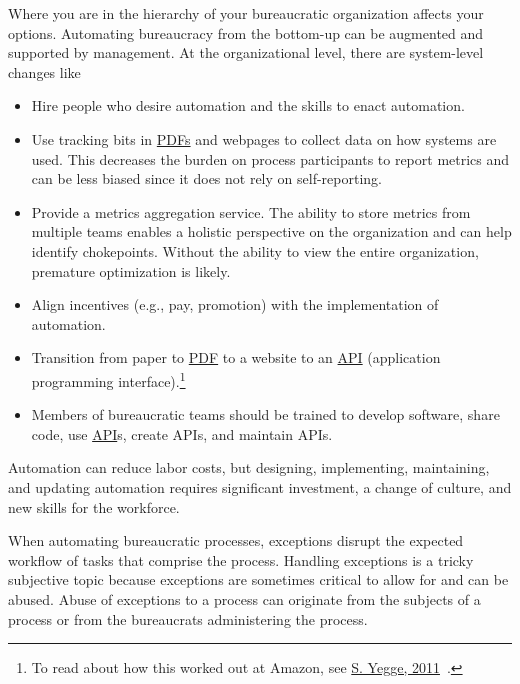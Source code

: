 Where you are in the hierarchy of your bureaucratic organization affects your options. 
Automating bureaucracy from the bottom-up can be augmented and supported by management. 
At the organizational level, there are system-level changes like
\begin{itemize}
    \item Hire people who desire automation and the skills to enact automation.
    \item Use tracking bits in
    \href{https://en.wikipedia.org/wiki/PDF}{PDFs} and webpages to collect data on how systems are used. This decreases the burden on process participants to report metrics and can be less biased since it does not rely on self-reporting.
    \item Provide a metrics aggregation service. The ability to store metrics from multiple teams enables a holistic perspective on the organization and can help identify chokepoints. Without the ability to view the entire organization, premature optimization is likely.
    \item Align incentives (e.g., pay, promotion) with the implementation of automation.
    \item Transition from paper to 
    \href{https://en.wikipedia.org/wiki/PDF}{PDF} 
    to a website to an 
    \href{https://en.wikipedia.org/wiki/API}{API} (application programming interface).\footnote{To read about how this worked out at Amazon, see \href{https://gist.github.com/bhpayne/49c8379a3ea880b7cc079fc8d32c87a7}{S. Yegge, 2011}~\cite{2011_Yegge}.}
    \item Members of bureaucratic teams should be trained to develop software, share code, use \href{https://en.wikipedia.org/wiki/API}{API}s, 
    create APIs, and maintain APIs.
\end{itemize}



Automation can reduce labor costs, but designing, implementing, maintaining, and updating automation requires significant investment, a change of culture, and new skills for the workforce.  


When automating bureaucratic processes, exceptions disrupt the expected workflow of tasks that comprise the process. Handling exceptions is a tricky subjective topic because exceptions are sometimes critical to allow for and can be abused. Abuse of exceptions to a process can originate from the subjects of a process or from the bureaucrats administering the process.